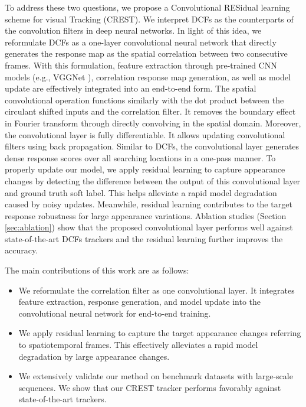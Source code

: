 \documentclass[10pt,twocolumn,letterpaper]{article}
\newcommand{\ryn}[1]{{\color{black}{#1}}}
\begin{document}
To address these two questions, we propose a Convolutional RESidual learning scheme for visual Tracking (CREST). We interpret DCFs as the counterparts of the convolution filters in deep neural networks. In light of this idea, we reformulate DCFs as a one-layer convolutional neural network that directly generates the response map as the spatial correlation between two consecutive frames. With this formulation, feature extraction through pre-trained CNN models (e.g., VGGNet \cite{simonyan-iclr14-very}), correlation response map generation, as well as model update are effectively integrated into an end-to-end form. The spatial convolutional operation functions similarly with the dot product between the circulant shifted inputs and the correlation filter. It removes the boundary effect in Fourier transform through directly convolving in the spatial domain. Moreover, the convolutional layer is fully differentiable. It allows updating \ryn{the} convolutional filters using back propagation.
Similar to DCFs, the convolutional layer generates dense response scores over all searching locations in a one-pass manner. To properly update our model, we apply residual learning \cite{he-cvpr16-resnet} to capture appearance changes by detecting the difference between the output of this convolutional layer and ground truth soft label. This helps alleviate a rapid model degradation caused by noisy updates. Meanwhile, residual learning contributes to the target response robustness for large appearance variations. Ablation studies (Section \ref{sec:ablation}) show that the proposed convolutional layer performs well against state-of-the-art DCFs trackers and the residual learning \ryn{approach} further improves the accuracy.

The main contributions of this work are as follows:
\begin{itemize}[noitemsep,nolistsep]
  \item We reformulate the correlation filter as one convolutional layer. It integrates feature extraction, response generation, and model update into the convolutional neural network for end-to-end training.
  \item We apply residual learning to capture the target appearance changes referring to spatiotemporal frames. This effectively alleviates a rapid model degradation by large appearance changes.
  \item We extensively validate our method on benchmark datasets with large-scale sequences. We show that our CREST tracker performs favorably against state-of-the-art trackers.
\end{itemize}
\end{document}

